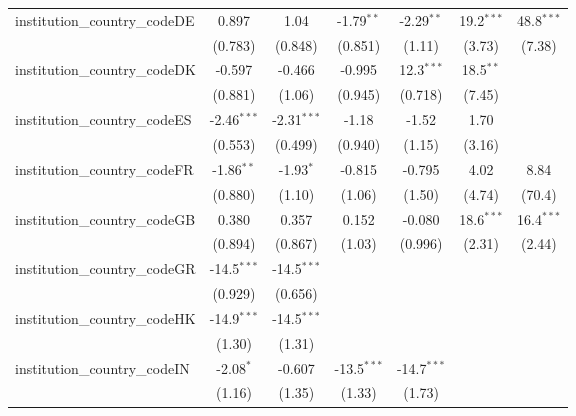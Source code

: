 \begin{tabular}{lcccccc}
   institution\_country\_codeDE          & 0.897         & 1.04          & -1.79$^{**}$  & -2.29$^{**}$  & 19.2$^{***}$  & 48.8$^{***}$\\   
                                         & (0.783)       & (0.848)       & (0.851)       & (1.11)        & (3.73)        & (7.38)\\   
   institution\_country\_codeDK          & -0.597        & -0.466        & -0.995        & 12.3$^{***}$  & 18.5$^{**}$   &   \\   
                                         & (0.881)       & (1.06)        & (0.945)       & (0.718)       & (7.45)        &   \\   
   institution\_country\_codeES          & -2.46$^{***}$ & -2.31$^{***}$ & -1.18         & -1.52         & 1.70          &   \\   
                                         & (0.553)       & (0.499)       & (0.940)       & (1.15)        & (3.16)        &   \\   
   institution\_country\_codeFR          & -1.86$^{**}$  & -1.93$^{*}$   & -0.815        & -0.795        & 4.02          & 8.84\\   
                                         & (0.880)       & (1.10)        & (1.06)        & (1.50)        & (4.74)        & (70.4)\\   
   institution\_country\_codeGB          & 0.380         & 0.357         & 0.152         & -0.080        & 18.6$^{***}$  & 16.4$^{***}$\\   
                                         & (0.894)       & (0.867)       & (1.03)        & (0.996)       & (2.31)        & (2.44)\\   
   institution\_country\_codeGR          & -14.5$^{***}$ & -14.5$^{***}$ &               &               &               &   \\   
                                         & (0.929)       & (0.656)       &               &               &               &   \\   
   institution\_country\_codeHK          & -14.9$^{***}$ & -14.5$^{***}$ &               &               &               &   \\   
                                         & (1.30)        & (1.31)        &               &               &               &   \\   
   institution\_country\_codeIN          & -2.08$^{*}$   & -0.607        & -13.5$^{***}$ & -14.7$^{***}$ &               &   \\   
                                         & (1.16)        & (1.35)        & (1.33)        & (1.73)        &               &   \\   

\end{tabular}

